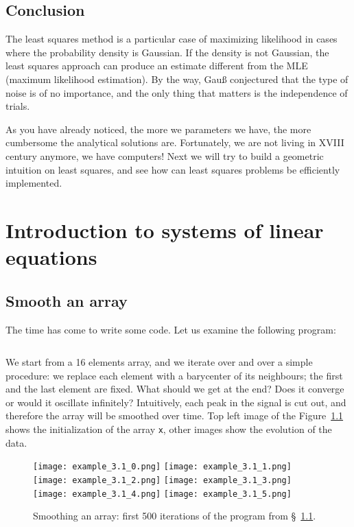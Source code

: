 \documentclass[notitlepage,oneside]{book}
\makeatletter
\newcommand{\authoredby}[1]{\addtocontents{toc}{\protect\@nameuse{authoredby#1}}}%
\makeatother
\begin{document}
\section*{Conclusion}
The least squares method is a particular case of maximizing likelihood in cases where the probability density is Gaussian.
If the density is not Gaussian, the least squares approach can produce an estimate different from the MLE (maximum likelihood estimation).
By the way, Gauß conjectured that the type of noise is of no importance, and the only thing that matters is the independence of trials.

As you have already noticed, the more we parameters we have, the more cumbersome the analytical solutions are.
Fortunately, we are not living in XVIII century anymore, we have computers!
Next we will try to build a geometric intuition on least squares, and see how can least squares problems be efficiently implemented.


\authoredby{B}
\chapter{Introduction to systems of linear equations}
\fancyhead[R]{\textcolor{green}{core text}}

\section{Smooth an array}
\label{sec:arraysmooth}
The time has come to write some code. Let us examine the following program:
\inputminted[frame=single,linenos=true]{python}{listings/example_3.1.py}
We start from a 16 elements array, and we iterate over and over a simple procedure: we replace each element with a barycenter of its neighbours;
the first and the last element are fixed. What should we get at the end? Does it converge or would it oscillate infinitely?
Intuitively, each peak in the signal is cut out, and therefore the array will be smoothed over time.
Top left image of the Figure~\ref{fig:linsys_smooth} shows the initialization of the array \texttt{x},
other images show the evolution of the data.

\begin{figure}[ht]
    \centering
    \texttt{[image: example\_3.1\_0.png]}
    \texttt{[image: example\_3.1\_1.png]}
    \texttt{[image: example\_3.1\_2.png]}
    \texttt{[image: example\_3.1\_3.png]}
    \texttt{[image: example\_3.1\_4.png]}
    \texttt{[image: example\_3.1\_5.png]}
\caption{Smoothing an array: first 500 iterations of the program from \S~\ref{sec:arraysmooth}.}
    \label{fig:linsys_smooth}
\end{figure}
\end{document}
